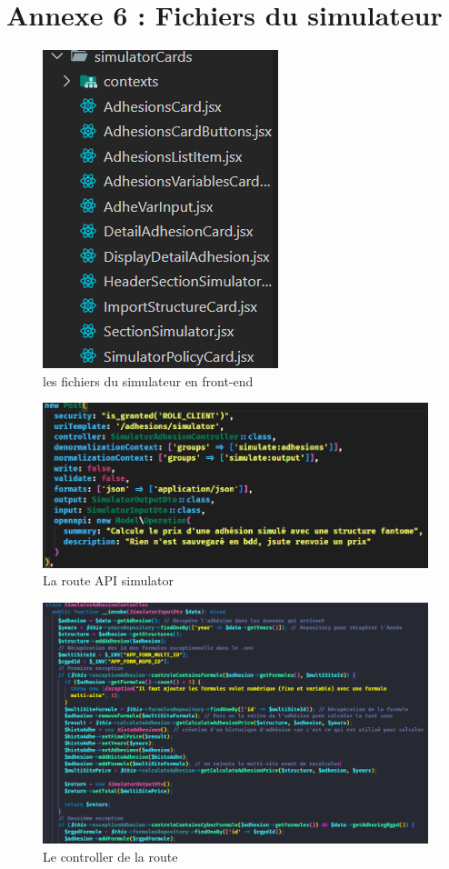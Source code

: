 \documentclass[a4paper,12pt]{report}
\begin{document}
\section{Annexe 6 : Fichiers du simulateur}
\begin{figure}[H]
    \centering
    \includegraphics[scale=0.8]{listeFilesSimu.png}
    \caption{les fichiers du simulateur en front-end}
    \label{fig:files}
\end{figure}
\begin{figure}[H]
    \centering
    \includegraphics[scale=0.5]{routeSimu.png}
    \caption{La route API simulator}
    \label{fig:route}
\end{figure}
\begin{figure}[H]
    \centering
    \includegraphics[scale=0.3]{controllerImage.png}
    \caption{Le controller de la route}
    \label{fig:controller}
\end{figure}
\end{document}
